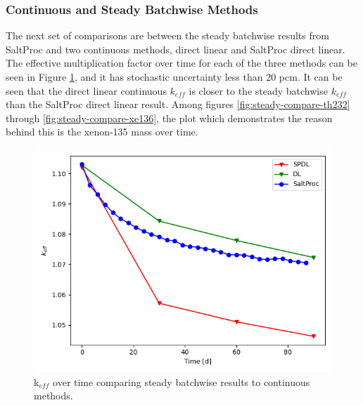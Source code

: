 \subsubsection{Continuous and Steady Batchwise Methods}

The next set of comparisons are between the steady batchwise results from SaltProc and two continuous methods, direct linear and SaltProc direct linear. The effective multiplication factor over time for each of the three methods can be seen in Figure \ref{fig:steady-compare-keff}, and it has stochastic uncertainty less than 20 pcm.
It can be seen that the direct linear continuous $k_{eff}$ is closer to the steady batchwise $k_{eff}$ than the SaltProc direct linear result. Among figures \ref{fig:steady-compare-th232} through \ref{fig:steady-compare-xe136}, the plot which demonstrates the reason behind this is the xenon-135 mass over time.

\begin{figure}[H]
  \centering
  \includegraphics[scale=0.7]{images/soln-1-2-keff.png}
  \caption{k$_{eff}$ over time comparing steady batchwise results to continuous methods.}
   \label{fig:steady-compare-keff}
\end{figure}

